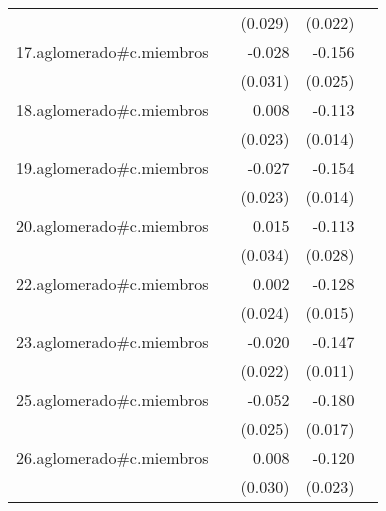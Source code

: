 {\begin{longtable}{l*{4}{D{.}{.}{-1}}}
            &                     &     (0.029)         &     (0.022)         &                     \\
\addlinespace
17.aglomerado#c.miembros&                     &      -0.028         &      -0.156\sym{***}&                     \\
            &                     &     (0.031)         &     (0.025)         &                     \\
\addlinespace
18.aglomerado#c.miembros&                     &       0.008         &      -0.113\sym{***}&                     \\
            &                     &     (0.023)         &     (0.014)         &                     \\
\addlinespace
19.aglomerado#c.miembros&                     &      -0.027         &      -0.154\sym{***}&                     \\
            &                     &     (0.023)         &     (0.014)         &                     \\
\addlinespace
20.aglomerado#c.miembros&                     &       0.015         &      -0.113\sym{***}&                     \\
            &                     &     (0.034)         &     (0.028)         &                     \\
\addlinespace
22.aglomerado#c.miembros&                     &       0.002         &      -0.128\sym{***}&                     \\
            &                     &     (0.024)         &     (0.015)         &                     \\
\addlinespace
23.aglomerado#c.miembros&                     &      -0.020         &      -0.147\sym{***}&                     \\
            &                     &     (0.022)         &     (0.011)         &                     \\
\addlinespace
25.aglomerado#c.miembros&                     &      -0.052\sym{*}  &      -0.180\sym{***}&                     \\
            &                     &     (0.025)         &     (0.017)         &                     \\
\addlinespace
26.aglomerado#c.miembros&                     &       0.008         &      -0.120\sym{***}&                     \\
            &                     &     (0.030)         &     (0.023)         &                     \\

\end{longtable}}
